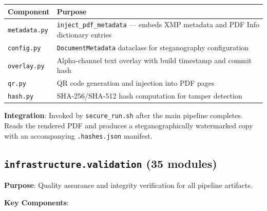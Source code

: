 \documentclass[
]{article}
\newcounter{none} %
\begin{document}
{\def\LTcaptype{none} %
\begin{longtable}[]{@{}
  >{\raggedright\arraybackslash}p{}
  >{\raggedright\arraybackslash}p{}@{}}
\toprule\noalign{}
\begin{minipage}[b]{\linewidth}\raggedright
Component
\end{minipage} & \begin{minipage}[b]{\linewidth}\raggedright
Purpose
\end{minipage} \\
\midrule\noalign{}
\endhead
\bottomrule\noalign{}
\endlastfoot
\texttt{metadata.py} & \texttt{inject\_pdf\_metadata} --- embeds XMP
metadata and PDF Info dictionary entries \\
\texttt{config.py} & \texttt{DocumentMetadata} dataclass for
steganography configuration \\
\texttt{overlay.py} & Alpha-channel text overlay with build timestamp
and commit hash \\
\texttt{qr.py} & QR code generation and injection into PDF pages \\
\texttt{hash.py} & SHA-256/SHA-512 hash computation for tamper
detection \\
\end{longtable}
}

\textbf{Integration}: Invoked by \texttt{secure\_run.sh} after the main
pipeline completes. Reads the rendered PDF and produces a
steganographically watermarked copy with an accompanying
\texttt{.hashes.json} manifest.

\subsection{\texorpdfstring{\texttt{infrastructure.validation} (35
modules)}{infrastructure.validation (35 modules)}}\label{infrastructure.validation-35-modules}

\textbf{Purpose}: Quality assurance and integrity verification for all
pipeline artifacts.

\textbf{Key Components}:
\end{document}
